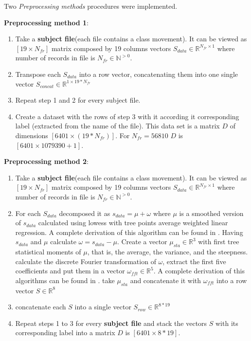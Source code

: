 Two \textit{Preprocessing methods} procedures were implemented.

\textbf{Preprocessing method 1}:
\begin{enumerate}
	\item Take a \textbf{subject file}(each file contains a class movement). It can be viewed as $[19 \times N_{fr}]$ matrix composed by 19 columns vectors $S_{data} \in \mathbb{R}^{N_{fr} \times 1}$  where number of records in file is $N_{fr} \in \mathbb{N}^{>0}$.
	\item Transpose each $S_{data}$ into a row vector, concatenating them into one single vector $S_{concat} \in  \mathbb{R}^{1 \times 19*N_{fr} }$ 
	\item Repeat step 1 and 2 for every subject file.
	\item Create a dataset with the rows of step 3 with it according it corresponding label (extracted from the name of the file). This data set is a matrix $D$ of dimensions $[6401 \times (19*N_{fr})]$. For $N_{fr}=56810$ $D$ is $[6401 \times 1079390+1]$.
\end{enumerate}

\textbf{Preprocessing method 2}:
\begin{enumerate}
	\item Take a \textbf{subject file}(each file contains a class movement). It can be viewed as $[19 \times N_{fr}]$ matrix composed by 19 columns vectors $S_{data} \in \mathbb{R}^{N_{fr} \times 1}$  where number of records in file is $N_{fr} \in \mathbb{N}^{>0}$.
	\item For each $S_{data}$ decomposed it as $s_{data}=\mu+\omega$ where $\mu$ is a smoothed version of $s_{data}$ calculated using lowess with tree points average weighted linear regression. A complete derivation of this algorithm can be found in \cite{1}. Having $s_{data}$ and $\mu$ calculate $\omega =s_{data}-\mu$. Create a vector $\mu_{sta} \in \mathbb{R}^{3}$ with first tree statistical moments of $\mu$, that is, the average, the variance, and the steepness. calculate the discrete Fourier transformation of $\omega$, extract the first five coefficients and put them in a vector $\omega_{fft} \in \mathbb{R}^{5}$. A complete derivation of this algorithms can be found in \cite{2}.
	take $\mu_{sta}$ and concatenate it with $\omega_{fft}$ into a row vector $S \in \mathbb{R}^{8}$
	\item concatenate each $S$ into a single vector $S_{row} \in \mathbb{R}^{8*19}$
	\item Repeat steps 1 to 3 for every \textbf{subject file} and stack the vectors $S$ with its corresponding label into a matrix $D$ is $[6401 \times 8*19]$.
\end{enumerate}

